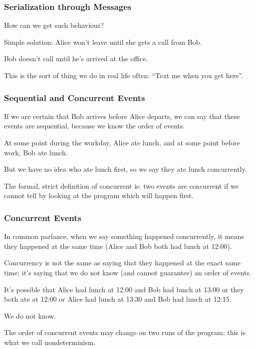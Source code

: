 \begin{frame}
	\frametitle{Serialization through Messages}

	How can we get such behaviour?

	Simple solution: Alice won't leave until she gets a call from Bob.

	Bob doesn't call until he's arrived at the office.

	This is the sort of thing we do in real life often: ``Text me when you get here''.



\end{frame}

\begin{frame}
	\frametitle{Sequential and Concurrent Events}

	If we are certain that Bob arrives before Alice departs, we can say that these events are \alert{sequential}, because we know the order of events.

	At some point during the workday, Alice ate lunch, and at some point before work, Bob ate lunch.

	But we have no idea who ate lunch first, so we say they ate lunch \alert{concurrently}.

	The formal, strict definition of concurrent is: two events are concurrent if we cannot tell by looking at the program which will happen first.

\end{frame}

\begin{frame}
	\frametitle{Concurrent Events}

	In common parlance, when we say something happened concurrently, it means they happened at the same time (Alice and Bob both had lunch at 12:00).

	Concurrency is not the same as saying that they happened at the exact same time; it's saying that we do not know (and cannot guarantee) an order of events.

	It's possible that Alice had lunch at 12:00 and Bob had lunch at 13:00 or they both ate at 12:00 or Alice had lunch at 13:30 and Bob had lunch at 12:15.

	We do not know.

	The order of concurrent events may change on two runs of the program; this is what we call \alert{nondeterminism}.

\end{frame}


